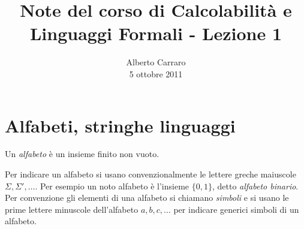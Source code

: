 \documentclass[runningheads,a4paper]{llncs}
\begin{document}
\mainmatter  %

\title{Note del corso di Calcolabilit\`{a} e Linguaggi Formali - Lezione 1}


%
%
\author{Alberto Carraro \\ 5 ottobre 2011}
%


%
%




\maketitle

\section{Alfabeti, stringhe linguaggi}

\begin{definition}[Alfabeto]
Un \emph{alfabeto} \`{e} un insieme finito non vuoto.
\end{definition}

Per indicare un alfabeto si usano convenzionalmente le lettere greche maiuscole $\Sigma,\Sigma',\ldots$. Per esempio un noto alfabeto \`{e} l'insieme $\{0,1\}$, detto \emph{alfabeto binario}. Per convenzione gli elementi di una alfabeto si chiamano \emph{simboli} e si usano le prime lettere minuscole dell'alfabeto $a,b,c,\ldots$ per indicare generici simboli di un alfabeto.
\end{document}
